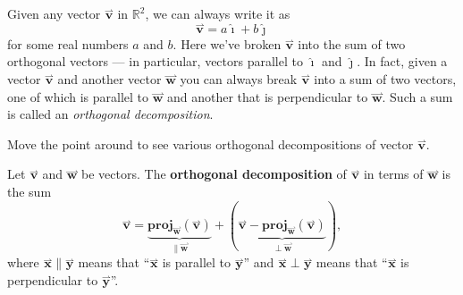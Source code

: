 \documentclass{ximera}
\begin{document}
Given any vector $\overset{\boldsymbol{\rightharpoonup}}{\mathbf{v}}$ in $\mathbb{R}^2$, we can always write it as
\[
\overset{\boldsymbol{\rightharpoonup}}{\mathbf{v}} = a\boldsymbol{\hat{\imath}} + b\boldsymbol{\hat{\jmath}}
\]
for some real numbers $a$ and $b$.  Here we've broken $\overset{\boldsymbol{\rightharpoonup}}{\mathbf{v}}$ into
the sum of two orthogonal vectors --- in particular, vectors parallel to
$\boldsymbol{\hat{\imath}}$ and $\boldsymbol{\hat{\jmath}}$. In fact, given a vector $\overset{\boldsymbol{\rightharpoonup}}{\mathbf{v}}$ and another
vector $\overset{\boldsymbol{\rightharpoonup}}{\mathbf{w}}$ you can always break $\overset{\boldsymbol{\rightharpoonup}}{\mathbf{v}}$ into a sum of two
vectors, one of which is parallel to $\overset{\boldsymbol{\rightharpoonup}}{\mathbf{w}}$ and another that is
perpendicular to $\overset{\boldsymbol{\rightharpoonup}}{\mathbf{w}}$. Such a sum is called an \textit{orthogonal
  decomposition}.
\begin{onlineOnly}
  Move the point around to see various orthogonal decompositions of
  vector $\overset{\boldsymbol{\rightharpoonup}}{\mathbf{v}}$.
  \begin{center}
  \end{center}
\end{onlineOnly}

\begin{definition}
Let $\overset{\boldsymbol{\rightharpoonup}}{\mathbf{v}}$ and $\overset{\boldsymbol{\rightharpoonup}}{\mathbf{w}}$ be vectors. The \textbf{orthogonal
  decomposition} of $\overset{\boldsymbol{\rightharpoonup}}{\mathbf{v}}$ in terms of $\overset{\boldsymbol{\rightharpoonup}}{\mathbf{w}}$ is the sum
\[
\overset{\boldsymbol{\rightharpoonup}}{\mathbf{v}} = \underbrace{\mathbf{proj}_{\overset{\boldsymbol{\rightharpoonup}}{\mathbf{w}}}(\overset{\boldsymbol{\rightharpoonup}}{\mathbf{v}})}_{\parallel \overset{\boldsymbol{\rightharpoonup}}{\mathbf{w}}} +  (\underbrace{\overset{\boldsymbol{\rightharpoonup}}{\mathbf{v}}-\mathbf{proj}_{\overset{\boldsymbol{\rightharpoonup}}{\mathbf{w}}}(\overset{\boldsymbol{\rightharpoonup}}{\mathbf{v}})}_{\perp \overset{\boldsymbol{\rightharpoonup}}{\mathbf{w}}}),
\]
where $\overset{\boldsymbol{\rightharpoonup}}{\mathbf{x}} \parallel \overset{\boldsymbol{\rightharpoonup}}{\mathbf{y}}$ means that ``$\overset{\boldsymbol{\rightharpoonup}}{\mathbf{x}}$ is parallel
to $\overset{\boldsymbol{\rightharpoonup}}{\mathbf{y}}$'' and $\overset{\boldsymbol{\rightharpoonup}}{\mathbf{x}} \perp\overset{\boldsymbol{\rightharpoonup}}{\mathbf{y}}$ means that ``$\overset{\boldsymbol{\rightharpoonup}}{\mathbf{x}}$ is
perpendicular to $\overset{\boldsymbol{\rightharpoonup}}{\mathbf{y}}$''.
\end{definition}
\end{document}
